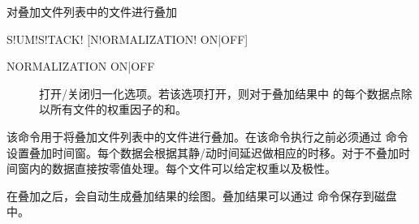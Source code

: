 \label{sss:sumstack}

对叠加文件列表中的文件进行叠加

\begin{SACSTX}
S!UM!S!TACK! [N!ORMALIZATION! ON|OFF]
\end{SACSTX}

\begin{description}
\item [NORMALIZATION ON|OFF] 打开/关闭归一化选项。若该选项打开，则对于叠加结果中
的每个数据点除以所有文件的权重因子的和。
\end{description}

该命令用于将叠加文件列表中的文件进行叠加。在该命令执行之前必须通过  命令设置叠加时间窗。每个数据会根据其静/动时间延迟做相应的时移。对于不叠加时间窗内的数据直接按零值处理。每个文件可以给定权重以及极性。

在叠加之后，会自动生成叠加结果的绘图。叠加结果可以通过  命令保存到磁盘中。
